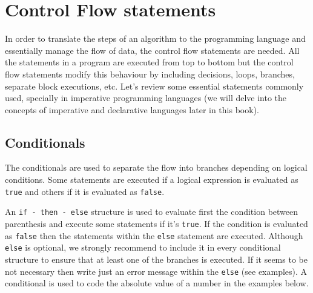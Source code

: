 





    \newpage
    \section{Control Flow statements}
In order to translate the steps of an algorithm to the programming language 
and essentially manage the flow of data, the control flow statements are needed. 
All the statements in a program are executed from top to bottom but 
the control flow statements modify this behaviour by including decisions, 
loops, branches, separate block executions, etc.
Let's review some essential statements commonly used, 
specially in imperative programming languages 
(we will delve into the concepts of imperative and declarative languages later in this book).


        \subsection{Conditionals}
        \vspace{-0.3cm}
The conditionals are used to separate the flow into branches depending on logical conditions. 
Some statements are executed if a logical expression is evaluated as \texttt{true} and others if it is evaluated as \texttt{false}.

An \texttt{if - then - else} structure is used to evaluate first the condition between parenthesis and execute some statements if it's \texttt{true}.
If the condition is evaluated as \texttt{false} then the statements within the \texttt{else} statement are executed. 
Although \texttt{else} is optional, we strongly recommend to include it in every conditional structure to ensure that at least one of the branches is executed. 
If it seems to be not necessary then write just an error message within the \texttt{else} (see examples). 
A conditional is used to code the absolute value of a number in the examples below. 

